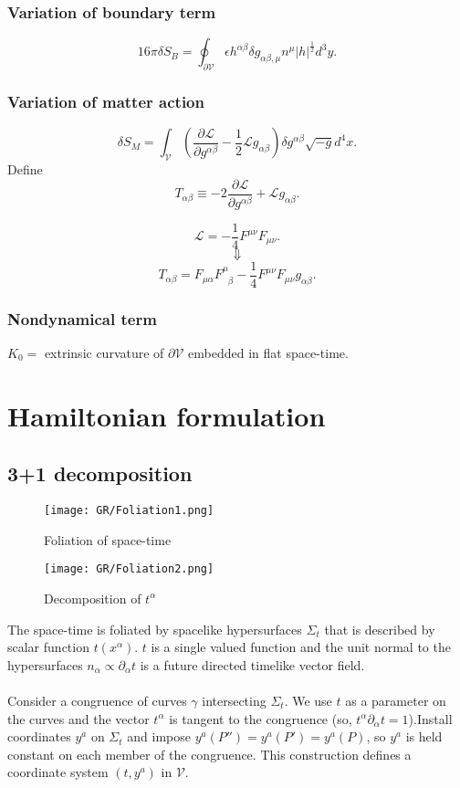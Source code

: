 \subsubsection{Variation of boundary term}
\[16\pi \delta S_B = \oint_{\partial \mathcal{V}} \epsilon h^{\alpha \beta} \delta g_{\alpha \beta, \mu} n^{\mu} |h|^{\frac{1}{2}} d^3 y .\]
\subsubsection{Variation of matter action}
\[\delta S_M = \int_{\mathcal{V}} \left( \frac{\partial \mathcal{L}}{\partial g^{\alpha \beta}} - \frac{1}{2} \mathcal{L} g_{\alpha \beta} \right) \delta g^{\alpha \beta} \sqrt{-g} d^4 x.\]
Define
\[T_{\alpha \beta} \equiv -2 \frac{\partial \mathcal{L}}{\partial g^{\alpha \beta}} + \mathcal{L} g_{\alpha \beta}.\]
\begin{example}
\[\mathcal{L} = -\frac{1}{4} F^{\mu \nu}F_{\mu \nu}.\]
\[\Downarrow\]
\[T_{\alpha \beta} = F_{\mu \alpha} F^{\mu}_{\phantom{\mu} \beta} - \frac{1}{4} F^{\mu \nu} F_{\mu \nu} g_{\alpha \beta}.\]
\end{example}
\subsubsection{Nondynamical term}
$K_0 = $ extrinsic curvature of $\partial \mathcal{V}$ embedded in flat space-time.

\section{Hamiltonian formulation}
\subsection{3+1 decomposition}
\begin{figure}[!h]
\begin{minipage}[t]{0.5\linewidth}
\centering
\texttt{[image: GR/Foliation1.png]}
\caption{Foliation of space-time}
\label{fig:side:a}
\end{minipage}%
\begin{minipage}[t]{0.5\linewidth}
\centering
\texttt{[image: GR/Foliation2.png]}
\caption{Decomposition of $t^{\alpha}$}
\label{fig:side:b}
\end{minipage}
\end{figure}
\noindent
The space-time is foliated by spacelike hypersurfaces $\Sigma_t$ that is described by scalar function $t(x^{\alpha})$. $t$ is a single valued function and the unit normal to the hypersurfaces $n_{\alpha} \propto \partial_{\alpha} t$ is a future directed timelike vector field.
\\ \\
Consider a congruence of curves $\gamma$ intersecting $\Sigma_t$. We use $t$ as a parameter on the curves and the vector $t^{\alpha}$ is tangent to the congruence (so, $t^{\alpha} \partial_{\alpha}t = 1$).Install coordinates $y^a$ on $\Sigma_t$ and impose $y^a(P'') = y^a(P') = y^a(P)$, so $y^a$ is held constant on each member of the congruence. This construction defines a coordinate system $(t,y^a)$ in $\mathcal{V}$.\\
